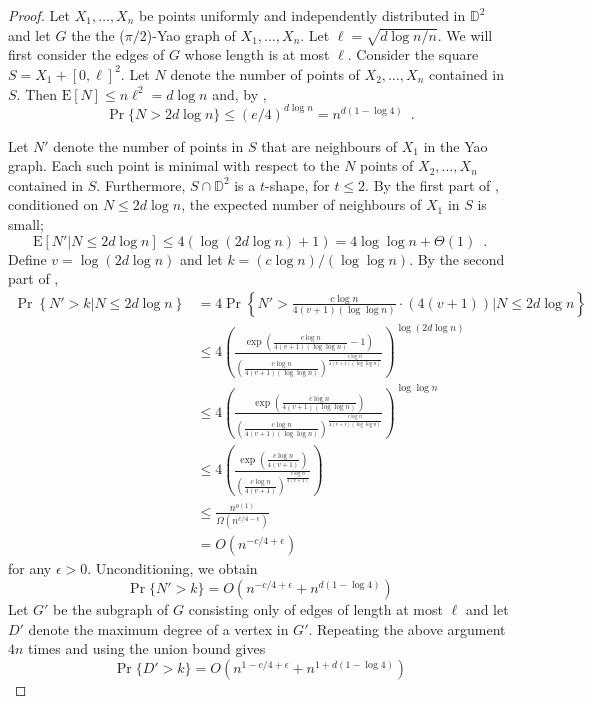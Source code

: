 \documentclass[lotsofwhite,charterfonts]{patmorin}
\newcommand{\D}{\mathbb{D}}
\newcommand{\PROB}{\Pr}
\newcommand{\EXP}{\mathrm{E}}
\begin{document}
\begin{proof}
Let $X_1,\ldots,X_n$ be points uniformly and independently distributed in
$\D^2$ and let $G$ the the ($\pi/2$)-Yao graph of $X_1,\ldots,X_n$.
Let $\ell=\sqrt{d\log n/n}$.  We will first consider the edges of $G$ whose
length is at most $\ell$.  Consider the square $S=X_1+[0,\ell]^2$.  Let
$N$ denote the number of points of $X_2,\ldots,X_n$ contained in $S$.  Then
$\EXP[N] \le n\ell^2 = d\log n$ and, by , 
\[
   \Pr\{N > 2d\log n\} \le (e/4)^{d\log n} = n^{d(1-\log 4)} \enspace .
\]

Let $N'$ denote the number of points in $S$ that are neighbours of $X_1$
in the Yao graph.  Each such point is minimal with respect to the $N$
points of $X_2,\ldots,X_n$ contained in $S$.  Furthermore, $S\cap\D^2$ is
a $t$-shape, for $t\le 2$.  By the first part of ,
conditioned on $N \le 2d\log n$, the expected number of neighbours of $X_1$
in $S$ is small;
\[
   \EXP[N'|N \le 2d\log n]
        \le 4(\log(2d\log n) + 1) 
          = 4\log\log n + \Theta(1)\enspace .
\]
Define $v=\log(2d\log n)$ and
let $k=(c\log n)/(\log\log n)$.  By the second part of
,
\[
  \begin{aligned}
    \PROB\left\{N'> k|N\le 2d\log n\right\}  
    & = 4\PROB\left\{N'> \frac{c\log n}{4(v+1)(\log\log n)}\cdot(4(v+1)) |N\le 2d\log n\right\} \\
    & \le4\left
         (\frac{\exp\left(\frac{c\log n}{4(v+1)(\log\log n)}-1\right)}
          {\left(\frac{c\log n}{4(v+1)(\log\log n)}\right)^
           \frac{c\log n}{4(v+1)(\log\log n)}}
         \right)^{\log(2d\log n)} \\
    & \le4\left
         (\frac{\exp\left(\frac{c\log n}{4(v+1)(\log\log n)}\right)}
          {\left(\frac{c\log n}{4(v+1)(\log\log n)}\right)^
           \frac{c\log n}{4(v+1)(\log\log n)}}
         \right)^{\log\log n} \\
    & \le
         4\left(\frac{\exp\left(\frac{c\log n}{4(v+1)}\right)}
          {\left(\frac{c\log n}{4(v+1)}\right)^{\frac{c\log n}{4(v+1)}}} \right) \\
    & \le \frac{n^{o(1)}}{\Omega(n^{c/4-\epsilon})} \\
    & =  O(n^{-c/4 + \epsilon}) 
 \end{aligned} 
\]
for any $\epsilon > 0$.  Unconditioning, we obtain
\[
   \PROB\{N' > k\} = O(n^{-c/4+\epsilon} + n^{d(1-\log 4)})
\]
Let $G'$ be the subgraph of $G$ consisting only of edges of length at most
$\ell$ and let $D'$ denote the maximum degree of a vertex in $G'$.
Repeating the above argument $4n$ times and using the union bound gives
\[
   \PROB\{D' > k\} = O(n^{1-c/4+\epsilon} + n^{1+d(1-\log 4)})
\]


\end{proof}
\end{document}
